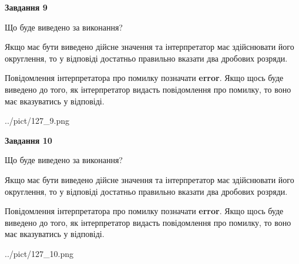 \documentclass[12pt, ukrainian]{article}
\begin{document}
{\begin {Large}
{\begin {center}\textbf{Завдання 9}\end {center}}\par
Що буде виведено за виконання? \par

Якщо має бути виведено дійсне значення та інтерпретатор має здійснювати його округлення, 
то у відповіді достатньо правильно вказати два дробових розряди.

Повідомлення інтерпретатора про помилку позначати \textbf{error}.
Якщо щось буде виведено до того, як інтерпретатор видасть повідомлення про помилку, 
то воно має вказуватись у відповіді. \par

\begin{center}
	{../pict/127_9.png}
\end{center}
\newpage

{\begin {center}\textbf{Завдання 10}\end {center}}\par
Що буде виведено за виконання? \par

Якщо має бути виведено дійсне значення та інтерпретатор має здійснювати його округлення, 
то у відповіді достатньо правильно вказати два дробових розряди.

Повідомлення інтерпретатора про помилку позначати \textbf{error}.
Якщо щось буде виведено до того, як інтерпретатор видасть повідомлення про помилку, 
то воно має вказуватись у відповіді. \par

\begin{center}
	{../pict/127_10.png}
\end{center}
\newpage

\end {Large}}
\end{document}
